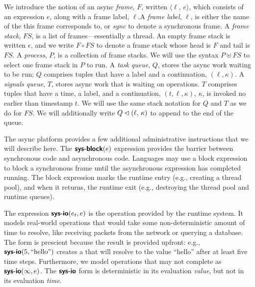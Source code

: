 We introduce the notion of an async \emph{frame}, $F$, written $\langle \ell,\,e\rangle$, which consists of an expression $e$, along with a frame label, $\ell$.\footnotemark A \emph{frame label}, $\ell$, is either the name of the \task this frame corresponds to, or \emph{sync} to denote a synchronous frame. A \emph{frame stack}, $FS$, is a list of frames---essentially a thread. An empty frame stack is written $\epsilon$, and we write $F \circ FS$ to denote a frame stack whose head is $F$ and tail is $FS$. A \emph{process}, $P$, is a collection of frame stacks. We will use the syntax $P \uplus FS$ to select one frame stack in $P$ to run. A \emph{task queue}, $Q$, stores the async work waiting to be run; $Q$ comprises tuples that have a label and a continuation, $(\ell,\kappa)$.
A \emph{signals queue}, $T$, stores async work that is waiting on  operations. $T$ comprises tuples that have a time, a label, and a continuation, $(t,\ell,\kappa)$, $\kappa$, is invoked no earlier than timestamp $t$.
We will use the same stack notation for $Q$ and $T$ as we do for $FS$. We will additionally write $Q \lhd (\ell,\,\kappa)$ to append to the end of the queue.%

The async platform provides a few additional administrative instructions that we will describe here. The $\text{\normalfont\textsf{\textbf{sys-block}}}(e)$ expression provides the barrier between synchronous code and asynchronous code. Languages may use a block expression to block a synchronous frame until the asynchronous expression has completed running. The block expression marks the runtime entry (e.g., creating a thread pool), and when it returns, the runtime exit (e.g., destroying the thread pool and runtime queues).

The expression $\text{\normalfont\textsf{\textbf{sys-io}}}(e_t,e)$ is the  operation provided by the runtime system. It models real-world  operations that would take some non-deterministic amount of time to resolve, like receiving packets from the network or querying a database. The form is prescient because the result is provided upfront: e.g., $\text{\normalfont\textsf{\textbf{sys-io}}}(5,\text{``hello''})$ creates a \task that will resolve to the value ``hello'' after at least five time steps. Furthermore, we model  operations that may not complete as $\text{\normalfont\textsf{\textbf{sys-io}}}(\infty, e)$. The $\text{\normalfont\textsf{\textbf{sys-io}}}$ form is deterministic in its evaluation \emph{value}, but not in its evaluation \emph{time}.

